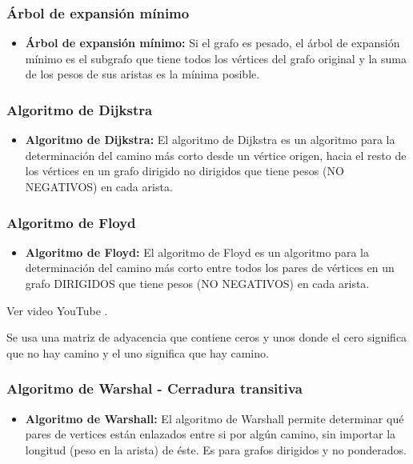 \documentclass[../main.tex]{subfiles}
\begin{document}
            \subsubsection{Árbol de expansión mínimo}
                \begin{itemize}
                    \item \textbf{Árbol de expansión mínimo:} Si el grafo es pesado, el árbol de expansión mínimo es el subgrafo que tiene todos los vértices del grafo original y la suma de los pesos de sus aristas es la mínima posible.
                \end{itemize}

            \subsubsection{Algoritmo de Dijkstra}
                \begin{itemize}
                    \item \textbf{Algoritmo de Dijkstra:} El algoritmo de Dijkstra es un algoritmo para la determinación del camino más corto desde un vértice origen, hacia el resto de los vértices en un grafo dirigido no dirigidos que tiene pesos (NO NEGATIVOS) en cada arista.
                \end{itemize}

            \subsubsection{Algoritmo de Floyd}
                \begin{itemize}
                    \item \textbf{Algoritmo de Floyd:} El algoritmo de Floyd es un algoritmo para la determinación del camino más corto entre todos los pares de vértices en un grafo DIRIGIDOS que tiene pesos (NO NEGATIVOS) en cada arista.
                \end{itemize}

                Ver video YouTube \cite{algoritmo_floyd_youtube_1}.

                Se usa una matriz de adyacencia que contiene ceros y unos donde el cero significa que no hay camino y el uno significa que hay camino.\\

            \subsubsection{Algoritmo de Warshal - Cerradura transitiva}
                \begin{itemize}
                    \item \textbf{Algoritmo de Warshall:} El algoritmo de Warshall permite determinar qué pares de vertices están enlazados entre si por algún camino, sin importar la longitud (peso en la arista) de éste. Es para grafos dirigidos y no ponderados.
                \end{itemize}
            
\end{document}
